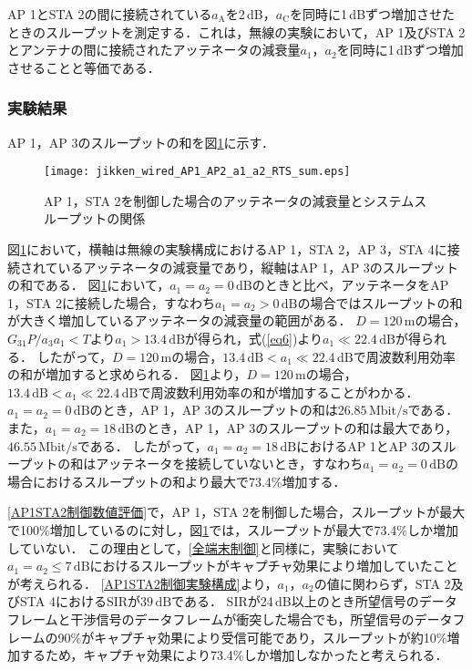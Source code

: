 \documentclass[master]{kuisthesis}		%
\begin{document}
AP 1とSTA 2の間に接続されている$a_\mathrm{A}$を2\,dB，$a_\mathrm{C}$を同時に1\,dBずつ増加させたときのスループットを測定する．これは，無線の実験において，AP 1及びSTA 2とアンテナの間に接続されたアッテネータの減衰量$a_1$，$a_2$を同時に1\,dBずつ増加させることと等価である．

\subsubsection{実験結果}
AP 1，AP 3のスループットの和を図\ref{throughput_a1_a2_RTS_sum}に示す．
\ifnum {}
\begin{figure}[!t]
\centering
\texttt{[image: jikken\_wired\_AP1\_AP2\_a1\_a2\_RTS\_sum.eps]}
\caption{AP 1，STA 2を制御した場合のアッテネータの減衰量とシステムスループットの関係}
\label{throughput_a1_a2_RTS_sum}
\end{figure}
\fi
図\ref{throughput_a1_a2_RTS_sum}において，横軸は無線の実験構成におけるAP 1，STA 2，AP 3，STA 4に接続されているアッテネータの減衰量であり，縦軸はAP 1，AP 3のスループットの和である．
図\ref{throughput_a1_a2_RTS_sum}において，$a_1 = a_2 = 0\,\mathrm{dB}$のときと比べ，アッテネータをAP 1，STA 2に接続した場合，すなわち$a_1 = a_2 > 0\,\mathrm{dB}$の場合ではスループットの和が大きく増加しているアッテネータの減衰量の範囲がある．
$D=120\,\mathrm{m}$の場合，$G_{31}P/a_3a_1<T$より$a_1>13.4\,\mathrm{dB}$が得られ，式(\ref{eq6})より$a_1 \ll 22.4\,\mathrm{dB}$が得られる．
したがって，$D=120\,\mathrm{m}$の場合，$13.4\,\mathrm{dB} < a_1 \ll 22.4\,\mathrm{dB}$で周波数利用効率の和が増加すると求められる．
図\ref{throughput_a1_a2_RTS_sum}より，$D=120\,\mathrm{m}$の場合，$13.4\,\mathrm{dB} < a_1 \ll 22.4\,\mathrm{dB}$で周波数利用効率の和が増加することがわかる．
$a_1=a_2=0\,\mathrm{dB}$のとき，AP 1，AP 3のスループットの和は$26.85\,\mathrm{Mbit/s}$である．
また，$a_1=a_2=18\,\mathrm{dB}$のとき，AP 1，AP 3のスループットの和は最大であり，$46.55\,\mathrm{Mbit/s}$である．
したがって，$a_1 = a_2 = 18\,\mathrm{dB}$におけるAP 1とAP 3のスループットの和はアッテネータを接続していないとき，すなわち$a_1 = a_2 = 0\,\mathrm{dB}$の場合におけるスループットの和より最大で73.4\%増加する．

\ref{AP1STA2制御数値評価}で，AP 1，STA 2を制御した場合，スループットが最大で100\%増加しているのに対し，図\ref{throughput_a1_a2_RTS_sum}では，スループットが最大で73.4\%しか増加していない．
この理由として，\ref{全端末制御}と同様に，実験において$a_1 = a_2  \leq 7\,\mathrm{dB}$におけるスループットがキャプチャ効果により増加していたことが考えられる．
\ref{AP1STA2制御実験構成}より，$a_1$，$a_2$の値に関わらず，STA 2及びSTA 4におけるSIRが$39\,\mathrm{dB}$である．
SIRが24\,dB以上のとき所望信号のデータフレームと干渉信号のデータフレームが衝突した場合でも，所望信号のデータフレームの90\%がキャプチャ効果により受信可能であり，スループットが約10\%増加するため，キャプチャ効果により73.4\%しか増加しなかったと考えられる．
\end{document}
